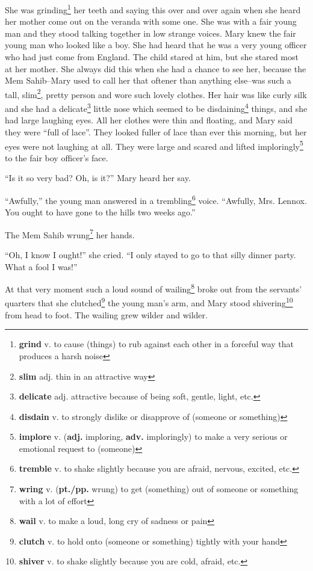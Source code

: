 She was grinding\footnote{\textbf{grind} v. to cause (things) to rub against each other in a forceful way that produces a harsh noise} her teeth and saying this over and over again when she heard her mother come out on the veranda with some one. She was with a fair young man and they stood talking together in low strange voices. Mary knew the fair young man who looked like a boy. She had heard that he was a very young officer who had just come from England. The child stared at him, but she stared most at her mother. She always did this when she had a chance to see her, because the Mem Sahib--Mary used to call her that oftener than anything else--was such a tall, slim\footnote{\textbf{slim} adj. thin in an attractive way}, pretty person and wore such lovely clothes. Her hair was like curly silk and she had a delicate\footnote{\textbf{delicate} adj. attractive because of being soft, gentle, light, etc.} little nose which seemed to be disdaining\footnote{\textbf{disdain} v. to strongly dislike or disapprove of (someone or something)} things, and she had large laughing eyes. All her clothes were thin and floating, and Mary said they were ``full of lace''. They looked fuller of lace than ever this morning, but her eyes were not laughing at all. They were large and scared and lifted imploringly\footnote{\textbf{implore} v. (\textbf{adj.}  imploring, \textbf{adv.} imploringly) to make a very serious or emotional request to (someone)} to the fair boy officer's face.

``Is it so very bad? Oh, is it?'' Mary heard her say.

``Awfully,'' the young man answered in a trembling\footnote{\textbf{tremble} v. to shake slightly because you are afraid, nervous, excited, etc.} voice. ``Awfully, Mrs. Lennox. You ought to have gone to the hills two weeks ago.''

The Mem Sahib wrung\footnote{\textbf{wring} v. (\textbf{pt./pp.} wrung) to get (something) out of someone or something with a lot of effort} her hands.

``Oh, I know I ought!'' she cried. ``I only stayed to go to that silly dinner party. What a fool I was!''

At that very moment such a loud sound of wailing\footnote{\textbf{wail} v. to make a loud, long cry of sadness or pain} broke out from the servants' quarters that she clutched\footnote{\textbf{clutch} v. to hold onto (someone or something) tightly with your hand} the young man's arm, and Mary stood shivering\footnote{\textbf{shiver} v. to shake slightly because you are cold, afraid, etc.} from head to foot. The wailing grew wilder and wilder.

